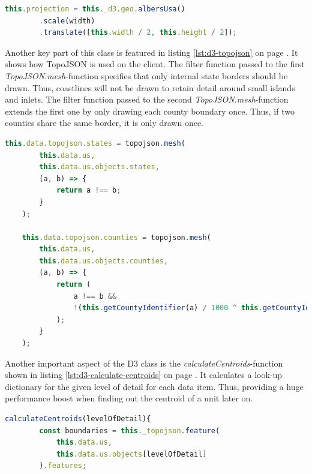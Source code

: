 \begin{description}
\begin{lstlisting}[language=JavaScript, caption={Map initialisation with a map projection, scale, and translation.}, label={lst:d3-map-init}]
    this.projection = this._d3.geo.albersUsa()
        .scale(width)
        .translate([this.width / 2, this.height / 2]);
\end{lstlisting}

Another key part of this class is featured in listing \ref{lst:d3-topojson} on page \pageref{lst:d3-topojson}. It shows how TopoJSON is used on the client. The filter function passed to the first \textit{TopoJSON.mesh}-function specifies that only internal state borders should be drawn. Thus, coastlines will not be drawn to retain detail around small islands and inlets. The filter function passed to the second \textit{TopoJSON.mesh}-function extends the first one by only drawing each county boundary once. Thus, if two counties share the same border, it is only drawn once.

\begin{lstlisting}[language=JavaScript, caption={TopoJSON usage on the client with the adaption of merging all geographic information.}, label={lst:d3-topojson}]
    this.data.topojson.states = topojson.mesh(
        this.data.us,
        this.data.us.objects.states,
        (a, b) => {
            return a !== b;
        }
    );

    this.data.topojson.counties = topojson.mesh(
        this.data.us,
        this.data.us.objects.counties,
        (a, b) => {
            return (
                a !== b &&
                !(this.getCountyIdentifier(a) / 1000 ^ this.getCountyIdentifier(b) / 1000)
            );
        }
    );
\end{lstlisting}

Another important aspect of the \ac{D3} class is the \textit{calculateCentroids}-function shown in listing \ref{lst:d3-calculate-centroids} on page \pageref{lst:d3-calculate-centroids}. It calculates a look-up dictionary for the given level of detail for each data item. Thus, providing a huge performance boost when finding out the centroid of a unit later on.

\begin{lstlisting}[language=JavaScript, caption={Calculate a look-up dictionary for all data items depending on the level of detail.}, label={lst:d3-calculate-centroids}]
    calculateCentroids(levelOfDetail){
        const boundaries = this._topojson.feature(
            this.data.us,
            this.data.us.objects[levelOfDetail]
        ).features;


\end{lstlisting}
\end{description}
